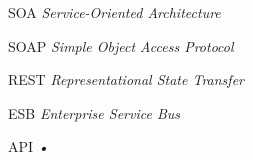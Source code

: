 \begin{siglas}
  \item[SOA] \textit{Service-Oriented Architecture}
  \item[SOAP] \textit{Simple Object Access Protocol}
  \item[REST] \textit{Representational State Transfer}
  \item[ESB] \textit{Enterprise Service Bus}
  \item[API] \textit{•}
\end{siglas}
